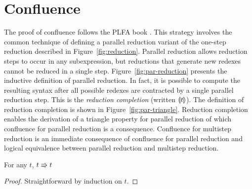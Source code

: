 \section{Confluence}



The proof of confluence follows the PLFA book \cite{plfa22.08}.
This strategy involves the common technique of defining a parallel reduction variant of the one-step reduction described in Figure~\ref{fig:reduction}.
Parallel reduction allows reduction steps to occur in any subexpression, but reductions that generate new redexes cannot be reduced in a single step.
Figure~\ref{fig:par-reduction} presents the inductive definition of parallel reduction.
In fact, it is possible to compute the resulting syntax after all possible redexes are contracted by a single parallel reduction step.
This is the \textit{reduction completion} (written $\llparenthesis {t} \rrparenthesis$).
The definition of reduction completion is shown in Figure~\ref{fig:par-triangle}.
Reduction completion enables the derivation of a triangle property for parallel reduction of which confluence for parallel reduction is a consequence.
Confluence for multistep reduction is an immediate consequence of confluence for parallel reduction and logical equivalence between parallel reduction and multistep reduction.



\begin{lemma}
    For any $t$, $t \Rrightarrow t$
    \label{lem:a:par_refl}
\end{lemma}
\begin{proof}
    Straightforward by induction on $t$.
\end{proof}

